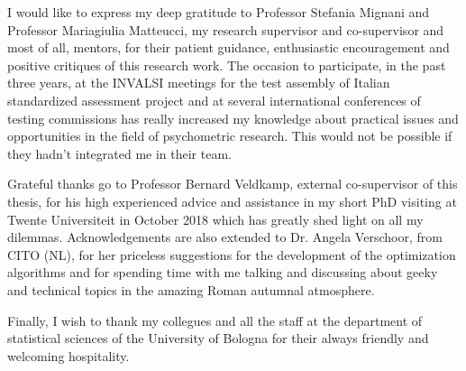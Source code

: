 \documentclass[
12pt, %
english, %
onehalfspacing,%
headsepline, %
]{MastersDoctoralThesis} %
\numberwithin{equation}{chapter} %
\begin{document}
	\begin{acknowledgements}
		\addchaptertocentry{\acknowledgementname} %
		\doublespacing
		I would like to express my deep gratitude to Professor Stefania Mignani and Professor Mariagiulia Matteucci, my research supervisor and co-supervisor and most of all, mentors, for their patient guidance, enthusiastic encouragement and positive critiques of this research work. The occasion to participate, in the past three years, at the INVALSI meetings for the test assembly of Italian standardized assessment project and at several international conferences of testing commissions has really increased my knowledge about practical issues and opportunities in the field of psychometric research. This would not be possible if they hadn't integrated me in their team.
		
		Grateful thanks go to Professor Bernard Veldkamp, external co-supervisor of this thesis, for his high experienced advice and assistance in my short PhD visiting at Twente Universiteit in October 2018 which has greatly shed light on all my dilemmas. Acknowledgements are also extended to Dr. Angela Verschoor, from CITO (NL), for her priceless suggestions for the development of the optimization algorithms and for spending time with me talking and discussing about geeky and technical topics in the amazing Roman autumnal atmosphere. 
		
		Finally, I wish to thank my collegues and all the staff at the department of statistical sciences of the University of Bologna for their always friendly and welcoming hospitality.
	\end{acknowledgements}
	
	
\end{document}
